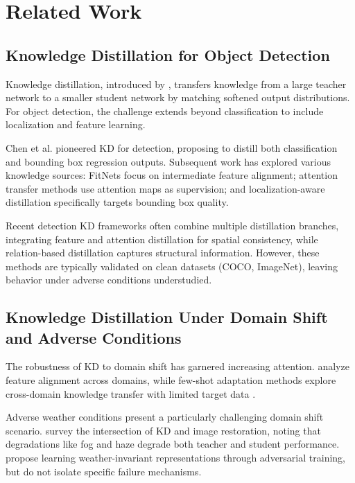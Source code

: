 \section{Related Work}
\label{sec:related}

\subsection{Knowledge Distillation for Object Detection}

Knowledge distillation, introduced by \cite{hinton2015distilling}, transfers knowledge from a large teacher network to a smaller student network by matching softened output distributions. For object detection, the challenge extends beyond classification to include localization and feature learning.

Chen et al. \cite{chen2017learning} pioneered KD for detection, proposing to distill both classification and bounding box regression outputs. Subsequent work has explored various knowledge sources: FitNets \cite{romero2014fitnets} focus on intermediate feature alignment; attention transfer methods \cite{zagoruyko2016paying} use attention maps as supervision; and localization-aware distillation \cite{dai2021general} specifically targets bounding box quality.

Recent detection KD frameworks often combine multiple distillation branches, integrating feature and attention distillation for spatial consistency, while relation-based distillation captures structural information. However, these methods are typically validated on clean datasets (COCO, ImageNet), leaving behavior under adverse conditions understudied.

\subsection{Knowledge Distillation Under Domain Shift and Adverse Conditions}

The robustness of KD to domain shift has garnered increasing attention. \cite{sun2016deep} analyze feature alignment across domains, while few-shot adaptation methods explore cross-domain knowledge transfer with limited target data \cite{mirzadeh2020improved}.

Adverse weather conditions present a particularly challenging domain shift scenario. \cite{guo2021meets} survey the intersection of KD and image restoration, noting that degradations like fog and haze degrade both teacher and student performance. \cite{du2022learning} propose learning weather-invariant representations through adversarial training, but do not isolate specific failure mechanisms.

